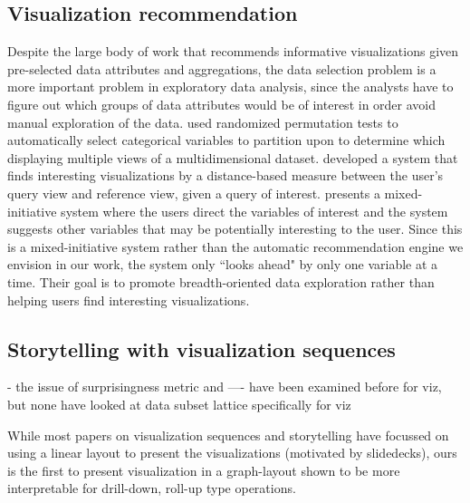 \subsection{Visualization recommendation}
\par Despite the large body of work that recommends informative visualizations given pre-selected data attributes and aggregations, the data selection problem is a more important problem in exploratory data analysis, since the analysts have to figure out which groups of data attributes would be of interest in order avoid manual exploration of the data.  \cite{Anand2015} used randomized permutation tests to automatically select categorical variables to partition upon to determine which displaying multiple views of a multidimensional dataset. \cite{Vartak2015} developed a system that finds interesting visualizations by a distance-based measure between the user's query view and reference view,  given a query of interest.\cite{Wongsuphasawat2016} presents a mixed-initiative system where the users direct the variables of interest and the system suggests other variables that may be potentially interesting to the user. Since this is a mixed-initiative system rather than the automatic recommendation engine we envision in our work, the system only ``looks ahead"  by only one variable at a time. Their goal is to promote breadth-oriented data exploration rather than helping users find interesting visualizations.
\subsection{Storytelling with visualization sequences}
- the issue of surprisingness metric and ---- have been examined before for viz, but none have looked at data subset lattice specifically for viz

While most papers on visualization sequences and storytelling have focussed on using a linear layout to present the visualizations (motivated by slidedecks), ours is the first to present visualization in a graph-layout shown to be more interpretable for drill-down, roll-up type operations.